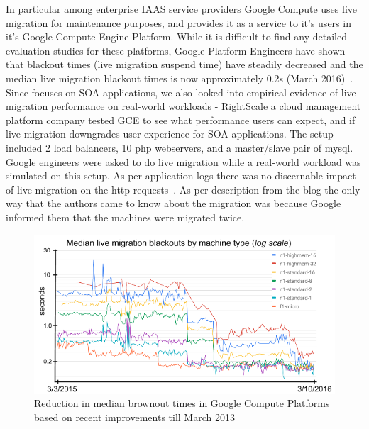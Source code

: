 In particular among enterprise IAAS service providers Google Compute uses live migration for maintenance purposes, and provides it as a service to it's users in it's Google Compute Engine Platform. While it is difficult to find any detailed evaluation studies for these platforms, Google Platform Engineers have shown that blackout times (live migration suspend time) have steadily decreased and the median live migration blackout times is now approximately 0.2s (March 2016)~\cite{googleblog}. Since \parikshan focuses on SOA applications, we also looked into empirical evidence of live migration performance on real-world workloads - RightScale a cloud management platform company tested GCE to see what performance users can expect, and if live migration downgrades user-experience for SOA applications. The setup included 2 load balancers, 10 php webservers, and a master/slave pair of mysql. Google engineers were asked to do live migration while a real-world workload was simulated on this setup. As per application logs there was no discernable impact of live migration on the http requests~\cite{googleanectodal}. As per description from the blog the only way that the authors came to know about the migration was because Google informed them that the machines were migrated twice.

\begin{figure}
\includegraphics[width=\textwidth]{figs/googleComputeImprovement} 
\caption{Reduction in median brownout times in Google Compute Platforms based on recent improvements till March 2013}
\label{GoogleComputeImprovement}
\end{figure}


